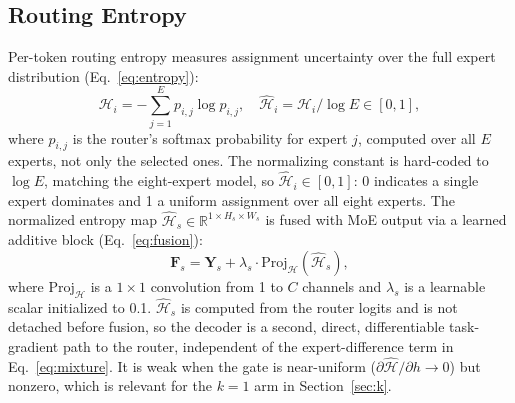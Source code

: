 \documentclass[10pt,a4paper,twocolumn,twoside]{article}
\newcommand{\bY}{\mathbf{Y}}
\newcommand{\bF}{\mathbf{F}}
\newcommand{\Hs}{\hat{\mathcal{H}}}
\newcommand{\reals}{\mathbb{R}}
\begin{document}
\subsection{Routing Entropy}
\label{sec:entropy}
Per-token routing entropy measures assignment uncertainty over the full expert distribution (Eq.~\eqref{eq:entropy}):
\begin{equation}
  \mathcal{H}_i = -\sum_{j=1}^{E} p_{i,j} \log p_{i,j}, \quad \Hs_i = \mathcal{H}_i / \log E \in [0, 1],
  \label{eq:entropy}
\end{equation}
where $p_{i,j}$ is the router's softmax probability for expert $j$, computed over all $E$ experts, not only the selected ones.
The normalizing constant is hard-coded to $\log E$, matching the eight-expert model, so $\Hs_i \in [0,1]$: 0 indicates a single expert dominates and 1 a uniform assignment over all eight experts.
The normalized entropy map $\Hs_s \in \reals^{1 \times H_s \times W_s}$ is fused with MoE output via a learned additive block (Eq.~\eqref{eq:fusion}):
\begin{equation}
  \bF_s = \bY_s + \lambda_s \cdot \text{Proj}_\mathcal{H}(\Hs_s),
  \label{eq:fusion}
\end{equation}
where $\text{Proj}_\mathcal{H}$ is a $1{\times}1$ convolution from 1 to $C$ channels and $\lambda_s$ is a learnable scalar initialized to 0.1.
$\Hs_s$ is computed from the router logits and is not detached before fusion, so the decoder is a second, direct, differentiable task-gradient path to the router, independent of the expert-difference term in Eq.~\eqref{eq:mixture}. It is weak when the gate is near-uniform ($\partial\Hs/\partial h \to 0$) but nonzero, which is relevant for the $k{=}1$ arm in Section~\ref{sec:k}.
\end{document}
